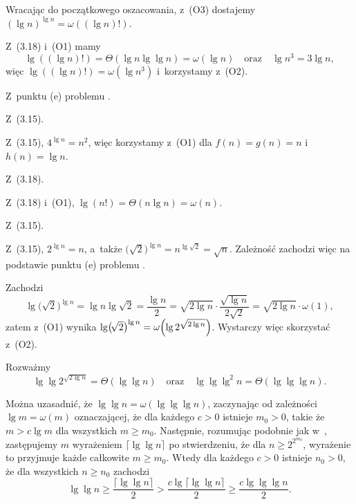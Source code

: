 \begin{description}[font=\textnormal, topsep=2ex, itemsep=2ex]
	Wracając do początkowego oszacowania, z~(O3) dostajemy $(\lg n)^{\lg n}=\omega((\lg n)!)$.
	\item[$(\lg n)!=\omega(n^3)$:]
	Z~(3.18) i~(O1) mamy
	\[
		\lg((\lg n)!) = \Theta(\lg n\lg\lg n) = \omega(\lg n) \quad\text{oraz}\quad \lg n^3 = 3\lg n,
	\]
	więc $\lg((\lg n)!)=\omega(\lg n^3)$ i~korzystamy z~(O2).
	\item[$n^3=\omega(n^2)$:]
	Z~punktu (e) problemu .
	\item[$n^2=\Theta\bigl(4^{\lg n}\bigr)$:]
	Z~(3.15).
	\item[$4^{\lg n}=\omega(n\lg n)$:]
	Z~(3.15), $4^{\lg n}=n^2$, więc korzystamy z~(O1) dla $f(n)=g(n)=n$ i~$h(n)=\lg n$.
	\item[$n\lg n=\Theta(\lg(n!))$:]
	Z~(3.18).
	\item[$\lg(n!)=\omega(n)$:]
	Z~(3.18) i~(O1), $\lg(n!)=\Theta(n\lg n)=\omega(n)$.
	\item[$n=\Theta\bigl(2^{\lg n}\bigr)$:]
	Z~(3.15).
	\item[$2^{\lg n}=\omega\bigl(\!\bigl(\!\sqrt{2}\bigr)^{\lg n}\bigr)$:]
	Z~(3.15), $2^{\lg n}=n$, a~także $\bigl(\!\sqrt{2}\bigr)^{\lg n}=n^{\lg\sqrt{2}}=\sqrt{n}$.
	Zależność zachodzi więc na podstawie punktu (e) problemu .
	\item[$\bigl(\!\sqrt{2}\bigr)^{\lg n}=\omega\Bigl(2^{\sqrt{2\lg n}}\Bigr)$:]
	Zachodzi
	\[
		\lg\bigl(\!\sqrt{2}\bigr)^{\lg n} = \lg n\lg\sqrt{2} = \frac{\lg n}{2} = \sqrt{2\lg n}\cdot\frac{\sqrt{\lg n}}{2\sqrt{2}} = \sqrt{2\lg n}\cdot\omega(1),
	\]
	zatem z~(O1) wynika $\lg\bigl(\!\sqrt{2}\bigr)^{\lg n}=\omega\Bigl(\lg2^{\sqrt{2\lg n}}\Bigr)$.
	Wystarczy więc skorzystać z~(O2).
	\item[$2^{\sqrt{2\lg n}}=\omega(\lg^2n)$:]
	Rozważmy
	\[
		\lg\lg2^{\sqrt{2\lg n}} = \Theta(\lg\lg n) \quad\text{oraz}\quad \lg\lg\lg^2n = \Theta(\lg\lg\lg n).
	\]

	Można uzasadnić, że $\lg\lg n=\omega(\lg\lg\lg n)$, zaczynając od zależności $\lg m=\omega(m)$ oznaczającej, że dla każdego $c>0$ istnieje $m_0>0$, takie że $m>c\lg m$ dla wszystkich $m\ge m_0$.
	Następnie, rozumując podobnie jak w~, zastępujemy $m$ wyrażeniem $\lceil\lg\lg n\rceil$ po stwierdzeniu, że dla $n\ge2^{2^{m_0}}$\!, wyrażenie to przyjmuje każde całkowite $m\ge m_0$.
	Wtedy dla każdego $c>0$ istnieje $n_0>0$, że dla wszystkich $n\ge n_0$ zachodzi
	\[
		\lg\lg n \ge \frac{\lceil\lg\lg n\rceil}{2} > \frac{c\lg\lceil\lg\lg n\rceil}{2} \ge \frac{c\lg\lg\lg n}{2}.
	\]


\end{description}

